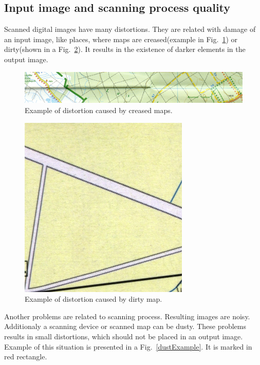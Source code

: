 \documentclass[a4paper,onecolumn,oneside,12pt]{memoir}
\begin{document}
\subsection{Input image and scanning process quality}

Scanned digital images have many distortions. They are related with damage of an input image, like
places, where maps are creased(example in Fig.~\ref{creaseExample}) or dirty(shown in a 
Fig.~\ref{dirtyExample}). It results in the existence of darker elements in the output image.

\begin{figure}[!ht]
\begin{center}
\includegraphics[scale=1.1]{images/creaseExample.jpg}
\caption{Example of distortion caused by creased maps.}
\label{creaseExample}
\end{center}
\end{figure}

\newpage

\begin{figure}[!ht]
\begin{center}
\includegraphics[scale=3.0]{images/dirtyExample.jpg}
\caption{Example of distortion caused by dirty map.}
\label{dirtyExample}
\end{center}
\end{figure}

Another problems are related to scanning process. Resulting images are noisy. Additionaly a
scanning device or scanned map can be dusty. These problems results in small distortions, which
should not be placed in an output image. Example of this situation is presented in a 
Fig.~\ref{dustExample}. It is marked in red rectangle.
\end{document}
